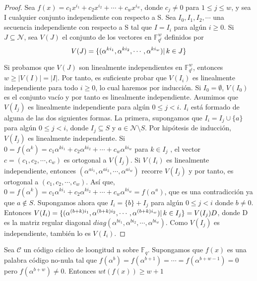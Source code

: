 \begin{proof}
Sea $f(x) = c_1x^{i_1} + c_2x^{i_2} + \cdots + c_wx^{i_w}$, donde $c_j \neq 0$ para $1 \leq j \leq w$, y sea I cualquier conjunto independiente con respecto a S. Sea $I_0,I_1,I_2, \cdots$ una secuencia independiente con respecto a S tal que $I = I_i$ para algún $i \geq 0$. Si $ J \subseteq \mathcal{N}$, sea $V(J)$ el conjunto de los vectores en $\mathbb{F}_{q^t}^w$ definidos por 
\[ 
V(J) = \{ (\alpha^{ki_1},\alpha^{ki_2}, \cdots, \alpha^{ki_w}) | \thinspace k \in J \}
\]

Si probamos que $V(J)$ son linealmente independientes en $\mathbb{F}_{q^t}^w$, entonces $w \geq |V(I)| = |I|$. Por tanto, es suficiente probar que $V(I_i)$ es linealmente independiente para todo $i \geq 0$, lo cual haremos por inducción. Si $I_0 = \emptyset$, $V(I_0)$ es el conjunto vacío y por tanto es linealmente independiente. Asumimos que $V(I_j)$ es linealmente independiente para algún $0 \leq j < i$. $I_i$ está formado de alguna de las dos siguientes formas. La primera, supongamos que $I_i = I_j \cup \{ a \}$ para algún $0 \leq j < i$, donde $I_j \subseteq S$ y $a \in \mathcal{N}\setminus S$. Por hipótesis de inducción, $V(I_j)$ es linealmente independiente. Si $ 0 = f(\alpha^k) = c_1\alpha^{ki_1} + c_2\alpha^{ki_2} + \cdots + c_w\alpha^{ki_w} $ para $k \in I_j$ , el vector $c = ( c_1, c_2 , \cdots , c_w ) $ es ortogonal a $V(I_j)$. Si $V(I_i)$ es linealmente independiente, entonces $(\alpha^{ai_1},\alpha^{ai_2}, \cdots, \alpha^{ai_w})$ recorre $V(I_j)$ y por tanto, es ortogonal a $(c_1,c_2, \cdots, c_w)$. Así que, $ 0 = f(\alpha^k) = c_1\alpha^{ki_1} + c_2\alpha^{ki_2} + \cdots + c_w\alpha^{ki_w} = f(\alpha^a)$, que es una contradicción ya que $a \not\in S$. Supongamos ahora que $I_i = \{ b \} + I_j$ para algún $0 \leq j < i$ donde $ b \neq 0 $. Entonces $V(I_i) =  \{ (\alpha^{(b+k)i_1},\alpha^{(b+k)i_2}, \cdots, \alpha^{(b+k)i_w}) | \thinspace k \in I_j \} = V(I_j)D$, donde D es la matriz regular diagonal $diag(\alpha^{bi_1},\alpha^{bi_2}, \cdots, \alpha^{bi_w})$. Como $V(I_j)$ es independiente, también lo es $V(I_i)$.
\end{proof}


\begin{corollary}
Sea $\mathcal{C}$ un código cíclico de loongitud n sobre $\mathbb{F}_q$. Supongamos que $f(x)$ es una palabra código no-nula tal que $f(\alpha^b) = f(\alpha^{b+1}) = \cdots = f(\alpha^{b+w-1}) = 0$ pero $f(\alpha^{b+w}) \neq 0 $. Entonces $ wt(f(x)) \geq w +1 $
\end{corollary}

